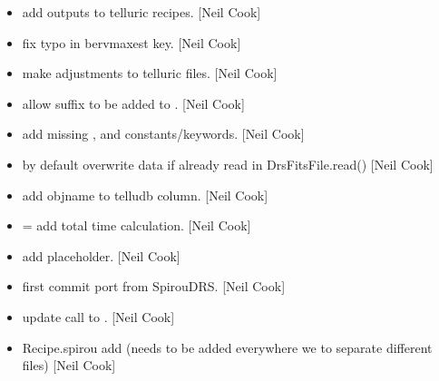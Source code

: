 \documentclass[a4paper,10pt,english]{report}
\begin{document}
\begin{itemize}
\item {} 
 \sphinxhyphen{} add outputs to
telluric recipes. {[}Neil Cook{]}

\item {} 
 \sphinxhyphen{} fix typo in bervmaxest key.
{[}Neil Cook{]}

\item {} 
 \sphinxhyphen{} make adjustments to
telluric files. {[}Neil Cook{]}

\item {} 
 \sphinxhyphen{} allow suffix to be
added to . {[}Neil Cook{]}

\item {} 
 \sphinxhyphen{} add missing
,  and  constants/keywords. {[}Neil
Cook{]}

\item {} 
 \sphinxhyphen{} by default overwrite data if already read in
DrsFitsFile.read() {[}Neil Cook{]}

\item {} 
 \sphinxhyphen{} add objname to telludb column. {[}Neil Cook{]}

\item {} 
 = add total time calculation.
{[}Neil Cook{]}

\item {} 
 \sphinxhyphen{} add  placeholder.
{[}Neil Cook{]}

\item {} 
 \sphinxhyphen{} first commit \sphinxhyphen{} port from
SpirouDRS. {[}Neil Cook{]}

\item {} 
 \sphinxhyphen{} update call to
. {[}Neil Cook{]}

\item {} 
Recipe.spirou \sphinxhyphen{} add  (needs to be added everywhere we
 to separate different files) {[}Neil Cook{]}


\end{itemize}
\end{document}
